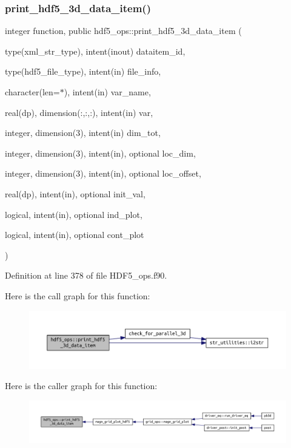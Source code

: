 \subsubsection{\texorpdfstring{print\+\_\+hdf5\+\_\+3d\+\_\+data\+\_\+item()}{print\_hdf5\_3d\_data\_item()}}
{\footnotesize\ttfamily integer function, public hdf5\+\_\+ops\+::print\+\_\+hdf5\+\_\+3d\+\_\+data\+\_\+item (\begin{DoxyParamCaption}\item[{type(xml\+\_\+str\+\_\+type), intent(inout)}]{dataitem\+\_\+id,  }\item[{type(hdf5\+\_\+file\+\_\+type), intent(in)}]{file\+\_\+info,  }\item[{character(len=$\ast$), intent(in)}]{var\+\_\+name,  }\item[{real(dp), dimension(\+:,\+:,\+:), intent(in)}]{var,  }\item[{integer, dimension(3), intent(in)}]{dim\+\_\+tot,  }\item[{integer, dimension(3), intent(in), optional}]{loc\+\_\+dim,  }\item[{integer, dimension(3), intent(in), optional}]{loc\+\_\+offset,  }\item[{real(dp), intent(in), optional}]{init\+\_\+val,  }\item[{logical, intent(in), optional}]{ind\+\_\+plot,  }\item[{logical, intent(in), optional}]{cont\+\_\+plot }\end{DoxyParamCaption})}



Definition at line 378 of file H\+D\+F5\+\_\+ops.\+f90.

Here is the call graph for this function\+:
\nopagebreak
\begin{figure}[H]
\begin{center}
\leavevmode
\includegraphics[width=350pt]{namespacehdf5__ops_ad794d069ca355f28536fba7e0d21bc13_cgraph}
\end{center}
\end{figure}
Here is the caller graph for this function\+:
\nopagebreak
\begin{figure}[H]
\begin{center}
\leavevmode
\includegraphics[width=350pt]{namespacehdf5__ops_ad794d069ca355f28536fba7e0d21bc13_icgraph}
\end{center}
\end{figure}
\mbox{\label{namespacehdf5__ops_a18a07099350020b44d6fbe93ed36e804}} 
